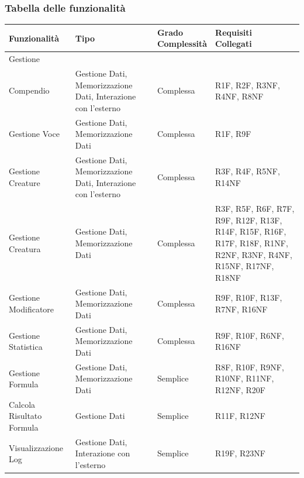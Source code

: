 \documentclass[a4paper, 11pt]{article}
\let\newline\\
\begin{document}
\subsubsection*{Tabella delle funzionalità}
\begin{center}
    \begin{tabular}{|p{3.5cm}|p{3cm}|p{3cm}|p{3.5cm}|}
        \hline
        \textbf{Funzionalità} & \textbf{Tipo} & \textbf{Grado \newline Complessità} & \textbf{Requisiti \newline Collegati} \\
        \hline
        Gestione \newline Compendio & Gestione Dati, Memorizzazione Dati, Interazione con l’esterno & Complessa & R1F, R2F, R3NF, R4NF, R8NF\\
        \hline
        Gestione Voce & Gestione Dati, Memorizzazione Dati & Complessa & R1F, R9F\\
        \hline
        Gestione Creature & Gestione Dati, Memorizzazione Dati, Interazione con l’esterno & Complessa & R3F, R4F, R5NF, R14NF\\
        \hline
        Gestione Creatura & Gestione Dati, Memorizzazione Dati & Complessa & R3F, R5F, R6F, R7F, R9F, R12F, R13F, R14F, R15F, R16F, R17F, R18F, R1NF, R2NF, R3NF, R4NF, R15NF, R17NF, R18NF\\
        \hline
        Gestione Modificatore & Gestione Dati, Memorizzazione Dati & Complessa & R9F, R10F, R13F, R7NF, R16NF\\
        \hline
        Gestione Statistica & Gestione Dati, Memorizzazione Dati & Complessa & R9F, R10F, R6NF, R16NF\\
        \hline
        Gestione Formula & Gestione Dati, Memorizzazione Dati & Semplice & R8F, R10F, R9NF, R10NF, R11NF, R12NF, R20F\\\hline
        Calcola Risultato Formula & Gestione Dati & Semplice & R11F, R12NF\\\hline
        Visualizzazione Log & Gestione Dati, Interazione con l'esterno & Semplice & R19F, R23NF\\\hline
    \end{tabular}
\end{center}

\vspace{2em}

\setlength{\tabcolsep}{10pt}
\end{document}
